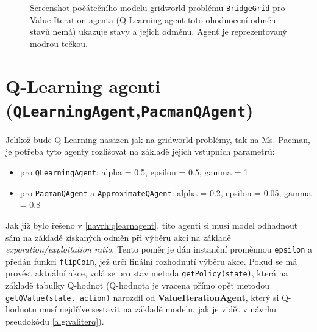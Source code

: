 \begin{figure}[!htbp]
\begin{center}
  \caption{Screenshot počátečního modelu gridworld problému \texttt{BridgeGrid} pro Value Iteration agenta (Q-Learning agent toto ohodnocení odměn stavů nemá) ukazuje stavy a jejich odměnu. Agent je reprezentovaný modrou tečkou.}
  \label{img:bridgeGridDefault}
\end{center}
\end{figure}

\section{Q-Learning agenti (\texttt{QLearningAgent},\texttt{PacmanQAgent})}
Jelikož bude Q-Learning nasazen jak na gridworld problémy, tak na Ms. Pacman, je potřeba tyto agenty rozlišovat na základě jejich vstupních parametrů:
\begin{itemize}
\item pro \texttt{QLearningAgent}: alpha = 0.5, epsilon = 0.5, gamma = 1
\item pro \texttt{PacmanQAgent} a \texttt{ApproximateQAgent}: alpha = 0.2, epsilon = 0.05, gamma = 0.8
\end{itemize}

Jak již bylo řešeno v \ref{navrh:qlearnagent}, tito agenti si musí model odhadnout sám na základě získaných odměn při výběru akcí na základě \textit{exporation/exploitation ratio}. Tento poměr je dán instanční proměnnou \texttt{epsilon} a předán funkci \texttt{flipCoin}, jež určí finální rozhodnutí výběru akce. Pokud se má provést aktuální akce, volá se pro stav metoda \texttt{getPolicy(state)}, která na základě tabulky Q-hodnot (Q-hodnota je vracena přímo opět metodou \texttt{getQValue(state, action)} narozdíl od \textbf{ValueIterationAgent}, který si Q-hodnotu musí nejdříve sestavit na základě modelu, jak je vidět v návrhu pseudokódu \ref{alg:valiterq}).

